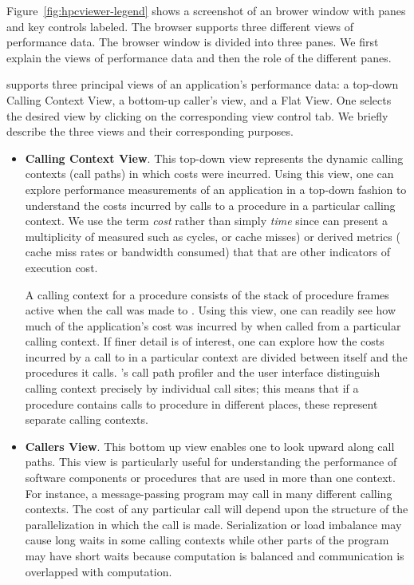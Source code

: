 Figure~\ref{fig:hpcviewer-legend} shows a screenshot of an \hpcviewer{} brower window with panes and key controls labeled.
The browser supports three different views of performance data.
The browser window is divided into three panes.
We first explain the views of performance data and then the role of the different panes.


\hpcviewer{} supports three principal views of an application's performance data: a top-down Calling Context View, a bottom-up caller's view, and a Flat View.
One selects the desired view by clicking on the corresponding view control tab.
We briefly describe the three views and their corresponding purposes.

\begin{itemize}
\item \textbf{Calling Context View}.
  This top-down view represents the dynamic calling contexts (call paths) in which costs were incurred.
  Using this view, one can explore performance measurements of an application in a top-down fashion to understand the costs incurred by calls to a procedure in a particular calling context.
  We use the term \emph{cost} rather than simply \emph{time} since \hpcviewer{} can present a multiplicity of measured such as cycles, or cache misses) or derived metrics (\eg{} cache miss rates or bandwidth consumed) that that are other indicators of execution cost.

  A calling context for a procedure  consists of the stack of procedure frames active when the call was made to .
  Using this view, one can readily see how much of the application's cost was incurred by  when called from a particular calling context.
  If finer detail is of interest, one can explore how the costs incurred by a call to  in a particular context are divided between  itself and the procedures it calls.
  \HPCToolkit{}'s call path profiler \hpcrun{} and the \hpcviewer{} user interface distinguish calling context precisely by individual call sites; this means that if a procedure  contains calls to procedure  in different places, these represent separate calling contexts.

\item \textbf{Callers View}. This bottom up view enables one to look upward along call paths. This view is particularly useful for understanding the performance of software components or procedures that are used in more than one context. For instance, a message-passing program may call  in many different calling contexts. The cost of any particular call will depend upon the structure of the parallelization in which the call is made. Serialization or load imbalance may cause long waits in some calling contexts while other parts of the program may have short waits because computation is balanced and communication is overlapped with computation.


\end{itemize}

